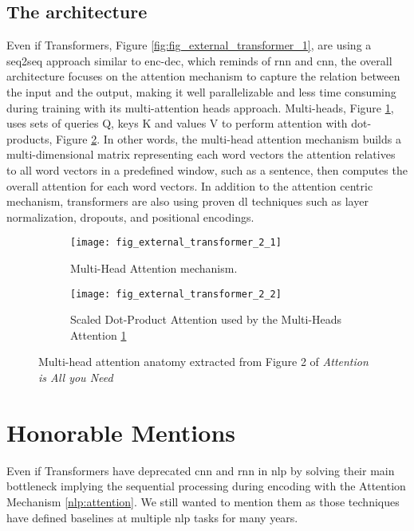\subsection{The architecture}
Even if Transformers, Figure \ref{fig:fig_external_transformer_1}, are using a \gls{seq2seq} approach similar to \gls{enc-dec}, which reminds of \gls{rnn} and \gls{cnn}, the overall architecture focuses on the attention mechanism to capture the relation between the input and the output, making it well parallelizable and less time consuming during training with its multi-attention heads approach. Multi-heads, Figure \ref{fig:fig_external_transformer_2_1}, uses sets of queries Q, keys K and values V to perform attention with dot-products, Figure \ref{fig:fig_external_transformer_2_2}. In other words, the multi-head attention mechanism builds a multi-dimensional matrix representing each word vectors the attention relatives to all word vectors in a predefined window, such as a sentence, then computes the overall attention for each word vectors. In addition to the attention centric mechanism, transformers are also using proven \gls{dl} techniques such as layer normalization, dropouts, and positional encodings.

\begin{figure}
	\begin{subfigure}{.5\textwidth}
		\centering
		\texttt{[image: fig\_external\_transformer\_2\_1]}
		\caption{Multi-Head Attention mechanism.}
		\label{fig:fig_external_transformer_2_1}
	\end{subfigure}
	\hfill
	\begin{subfigure}{.5\textwidth}
		\centering
		\texttt{[image: fig\_external\_transformer\_2\_2]}
    	\caption{Scaled Dot-Product Attention used by the Multi-Heads Attention \ref{fig:fig_external_transformer_2_1}}
    	\label{fig:fig_external_transformer_2_2}
	\end{subfigure}
	\caption{Multi-head attention anatomy extracted from Figure 2 of \textit{Attention is All you Need} \autocite{paper:journals/corr/VaswaniSPUJGKP17}}
	\label{fig:fig_external_transformer_2}
\end{figure}


\section{Honorable Mentions}
Even if Transformers have deprecated \gls{cnn} and \gls{rnn} in \gls{nlp} by solving their main bottleneck implying the sequential processing during encoding with the Attention Mechanism \ref{nlp:attention}. We still wanted to mention them as those techniques have defined baselines at multiple \gls{nlp} tasks for many years.


